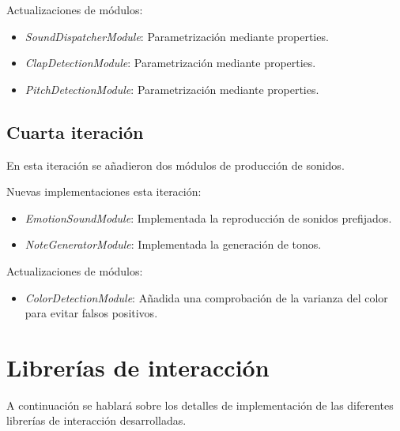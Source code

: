 Actualizaciones de módulos:

\begin{itemize}
	\item \textit{SoundDispatcherModule}: Parametrización mediante properties.
	\item \textit{ClapDetectionModule}: Parametrización mediante properties.
	\item \textit{PitchDetectionModule}: Parametrización mediante properties.

\end{itemize}

\subsection{Cuarta iteración}

En esta iteración se añadieron dos módulos de producción de sonidos.


Nuevas implementaciones esta iteración:
\begin{itemize}
	\item \textit{EmotionSoundModule}: Implementada la reproducción de sonidos prefijados.
	\item \textit{NoteGeneratorModule}: Implementada la generación de tonos.
\end{itemize}

Actualizaciones de módulos:

\begin{itemize}
	\item \textit{ColorDetectionModule}: Añadida una comprobación de la varianza del color para evitar falsos positivos.
\end{itemize}
\newpage

\section{Librerías de interacción}
A continuación se hablará sobre los detalles de implementación de las diferentes librerías de interacción desarrolladas.
\label{sec:InteractionLibraries}

